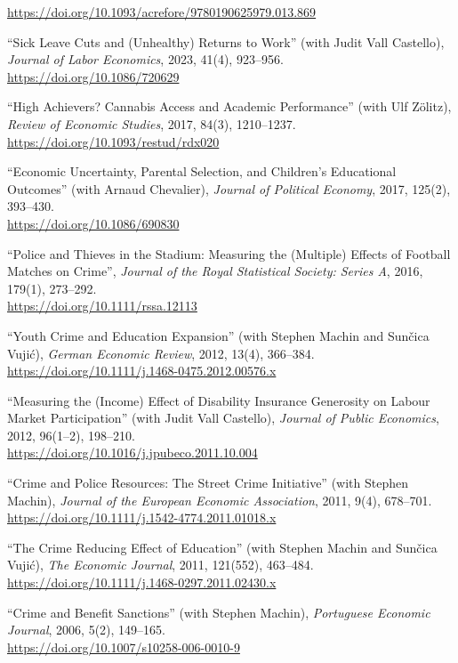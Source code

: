 \documentclass[11pt,a4paper]{article}
\begin{document}
\begin{pubs}
  \url{https://doi.org/10.1093/acrefore/9780190625979.013.869}
  \item ``Sick Leave Cuts and (Unhealthy) Returns to Work'' (with Judit Vall Castello), \emph{Journal of Labor Economics}, 2023, 41(4), 923--956.\\
  \url{https://doi.org/10.1086/720629}
  \item ``High Achievers? Cannabis Access and Academic Performance'' (with Ulf Z\"olitz), \emph{Review of Economic Studies}, 2017, 84(3), 1210--1237.\\
  \url{https://doi.org/10.1093/restud/rdx020}
  \item ``Economic Uncertainty, Parental Selection, and Children's Educational Outcomes'' (with Arnaud Chevalier), \emph{Journal of Political Economy}, 2017, 125(2), 393--430.\\
  \url{https://doi.org/10.1086/690830}
  \item ``Police and Thieves in the Stadium: Measuring the (Multiple) Effects of Football Matches on Crime'', \emph{Journal of the Royal Statistical Society: Series A}, 2016, 179(1), 273--292.\\
  \url{https://doi.org/10.1111/rssa.12113}
  \item ``Youth Crime and Education Expansion'' (with Stephen Machin and Sun\v{c}ica Vuji\'c), \emph{German Economic Review}, 2012, 13(4), 366--384.\\
  \url{https://doi.org/10.1111/j.1468-0475.2012.00576.x}
  \item ``Measuring the (Income) Effect of Disability Insurance Generosity on Labour Market Participation'' (with Judit Vall Castello), \emph{Journal of Public Economics}, 2012, 96(1--2), 198--210.\\
  \url{https://doi.org/10.1016/j.jpubeco.2011.10.004}
  \item ``Crime and Police Resources: The Street Crime Initiative'' (with Stephen Machin), \emph{Journal of the European Economic Association}, 2011, 9(4), 678--701.\\
  \url{https://doi.org/10.1111/j.1542-4774.2011.01018.x}
  \item ``The Crime Reducing Effect of Education'' (with Stephen Machin and Sun\v{c}ica Vuji\'c), \emph{The Economic Journal}, 2011, 121(552), 463--484.\\
  \url{https://doi.org/10.1111/j.1468-0297.2011.02430.x}
  \item ``Crime and Benefit Sanctions'' (with Stephen Machin), \emph{Portuguese Economic Journal}, 2006, 5(2), 149--165.\\
  \url{https://doi.org/10.1007/s10258-006-0010-9}
\end{pubs}
\end{document}
